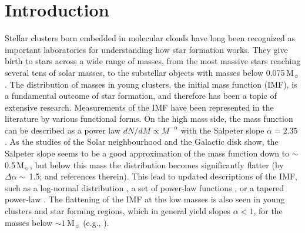 \documentclass[a4paper,fleqn,usenatbib]{mnras}
\begin{document}


\section{Introduction}

Stellar clusters born embedded in molecular clouds have long been recognized as important laboratories for understanding how star formation works.
They give birth to stars across a wide range of masses, from the most massive stars reaching several tens of 
solar masses, to the substellar objects with masses below 0.075\,M$_{\sun}$. The distribution of 
masses in young clusters, the initial mass function (IMF), is a fundamental outcome of star formation, and therefore has 
been a topic of extensive research. 
Measurements of the IMF have been represented in the literature by various functional forms.
On the high mass side, the mass function can be described as a 
power law $dN/dM \propto M^{-\alpha}$
with the Salpeter slope $\alpha = 2.35$ \citep{salpeter55}. 
As the studies of the Solar neighbourhood and the Galactic disk show, the Salpeter slope 
seems to be a good approximation of the mass function down to $\sim\,$0.5\,M$_{\sun}$, but below this mass
the distribution becomes significantly flatter (by $\Delta \alpha \sim\,$1.5; \citealt{luhman12} and references therein). 
This lead to updated descriptions of the IMF, such as a log-normal distribution \citep{chabrier05}, 
a set of power-law functions \citep{kroupa01}, or a tapered power-law \citep{demarchi05}.
The flattening of the IMF at the low masses is also seen in young clusters and star forming regions, which 
in general yield slopes $\alpha < 1$,
for the masses below $\sim 1$\,M$_{\sun}$ (e.g., \citealt{luhman04c, luhman07, bayo11, penaramirez12, scholz12a, lodieu13, muzic15}).
\end{document}
